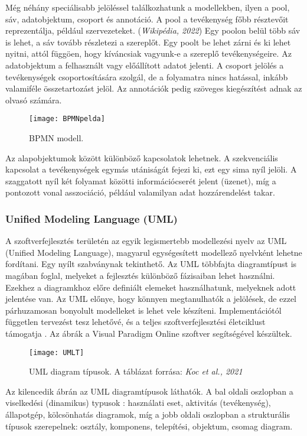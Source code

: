\documentclass[12pt]{article}
\begin{document}
Még néhány speciálisabb jelöléssel találkozhatunk a modellekben, ilyen a pool, sáv, adatobjektum, csoport és annotáció. A pool a tevékenység főbb résztevőit reprezentálja, például szervezeteket.  (\textit{Wikipédia, 2022}) Egy poolon belül több sáv is lehet, a sáv tovább részletezi a szereplőt. Egy poolt be lehet zárni és ki lehet nyitni, attól függöen, hogy kíváncsiak vagyunk-e a szereplő tevékenységeire. Az adatobjektum a felhasznált vagy előállított adatot jelenti. A csoport jelölés a tevékenységek csoportosítására szolgál, de a folyamatra nincs hatással, inkább valamiféle összetartozást jelöl. Az annotációk pedig szöveges kiegészítést adnak az olvasó számára.

\begin{figure}
\texttt{[image: BPMNpelda]}
\caption{ BPMN modell.}
\end{figure}

Az alapobjektumok között különböző kapcsolatok lehetnek. A szekvenciális kapcsolat a tevékenységek egymás utániságát fejezi ki, ezt egy sima nyíl jelöli. A szaggatott nyíl két folyamat közötti információcserét jelent (üzenet), míg a pontozott vonal asszociáció, például valamilyan adat hozzárendelést takar.

\subsubsection{Unified Modeling Language (UML)}

A szoftverfejlesztés területén az egyik legismertebb modellezési nyelv az UML (Unified Modeling Language), magyarul egységesített modellező nyelvként lehetne fordítani. Egy nyílt szabványnak tekinthető. Az UML többfajta diagramtípust is magában foglal, melyeket a fejlesztés különböző fázisaiban lehet használni. Ezekhez a diagramkhoz előre definiált elemeket használhatunk, melyeknek adott jelentése van. 
Az UML előnye, hogy könnyen megtanulhatók a jelölések, de ezzel párhuzamosan bonyolult modelleket is lehet vele készíteni. Implementációtól független tervezést tesz lehetővé, és a teljes szoftverfejlesztési életciklust támogatja \cite{UML2}.  Az ábrák a Visual Paradigm Online szoftver segítségével készültek.

\begin{figure}
\texttt{[image: UMLT]}
\caption{UML diagram típusok. A táblázat forrása:  \textit{Koc et al., 2021}
}
\end{figure}

Az kilencedik ábrán az UML diagramtípusok láthatók. A bal oldali oszlopban a viselkedési (dinamikus) typusok : használati eset, aktivitás (tevékenység), állapotgép, kölcsönhatás diagramok, míg a jobb oldali oszlopban a strukturális típusok szerepelnek: osztály, komponens, telepítési, objektum, csomag diagram.
\end{document}

